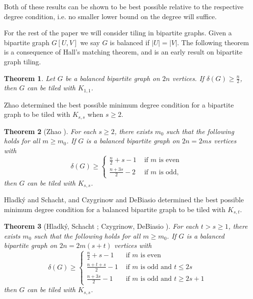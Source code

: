 \documentclass[oneside,12pt]{memoir}
\newtheorem{theorem}{Theorem}[section]
\begin{document}
Both of these results can be shown to be best possible relative to the respective degree condition, i.e. no smaller lower bound on the degree will suffice.

For the rest of the paper we will consider tiling in bipartite graphs.  Given a bipartite graph $G[U,V]$ we say $G$ is balanced if $|U|=|V|$.  The following theorem is a consequence of Hall's matching theorem, and is an early result on bipartite graph tiling.

\begin{theorem}\label{Hall1}
Let $G$ be a balanced bipartite graph on $2n$ vertices.  If $\delta(G)\geq \frac{n}{2}$, then $G$ can be tiled with $K_{1,1}$.
\end{theorem}

Zhao determined the best possible minimum degree condition for a bipartite graph to be tiled with $K_{s,s}$ when $s\geq 2$.

\begin{theorem}[Zhao \cite{Z}]\label{Zhao theorem}
For each $s\geq 2$, there exists $m_0$ such that the following holds for all $m\geq m_0$.  If $G$ is a balanced bipartite graph on $2n=2ms$ vertices with 
$$\delta(G)\geq \left\lbrace \begin{array}{ll} \frac{n}{2}+s-1   & \text{ if } m \text{ is even } \\
              \frac {n+3s}{2}-2 & \text{ if } m \text{ is odd, } \end{array} \right. $$
then $G$ can be tiled with $K_{s,s}$.
\end{theorem}



Hladk\'y and Schacht, and Czygrinow and DeBiasio determined the best possible minimum degree condition for a balanced bipartite graph to be tiled with $K_{s,t}$.

\begin{theorem}[Hladk\'y, Schacht \cite{HS}; Czygrinow, DeBiasio \cite{CD}]
For each $t>s\geq 1$, there exists $m_0$ such that the following holds for all $m\geq m_0$.  If $G$ is a balanced bipartite graph on $2n=2m(s+t)$ vertices with 
$$\delta(G)\geq \left\lbrace \begin{array}{ll} \frac{n}{2}+s-1   & \text{ if } m \text{ is even } \\
               \frac {n+t+s}{2}-1 & \text{ if } m \text{ is odd and } t\leq 2s \\
               \frac {n+3s}{2}-1 & \text{ if } m \text{ is odd and } t\geq 2s+1  \end{array} \right. $$
then $G$ can be tiled with $K_{s,s}$.
\end{theorem}
\end{document}
